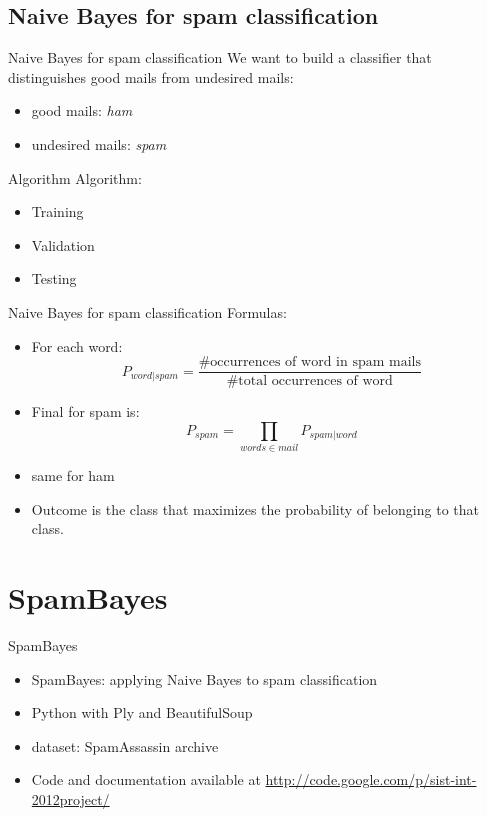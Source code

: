 \documentclass[xcolor=x11names,compress]{beamer}
\renewcommand{\(}{\begin{columns}}
\renewcommand{\)}{\end{columns}}
\newcommand{\<}[1]{\begin{column}{#1}}
\renewcommand{\>}{\end{column}}
\begin{document}
\subsection{Naive Bayes for spam classification}
\begin{frame}{Naive Bayes for spam classification}
We want to build a classifier that distinguishes good mails from undesired mails:
\begin{itemize}
    \item good mails: \textit{ham}
    \item undesired mails: \textit{spam}
\end{itemize}
\end{frame}

\begin{frame}{Algorithm}
Algorithm:
\begin{itemize}
    \item<1->Training
    \item<2->Validation
    \item<3->Testing
\end{itemize}
\end{frame}

\begin{frame}{Naive Bayes for spam classification}
Formulas:
\begin{itemize}
    \item<1->For each word: $$P_{word|spam} = \frac{\mbox{\# occurrences of word in spam mails}}{\mbox{\# total occurrences of word}}$$
    \item<2->Final for spam is: $$P_{spam} = \prod_{words \in mail} P_{spam|word}$$
    \item<3->same for ham
    \item<4->Outcome is the class that maximizes the probability of belonging to that class.
\end{itemize}
\end{frame}

\section{SpamBayes}
\begin{frame}{SpamBayes}
  \begin{itemize}
    \item SpamBayes: applying Naive Bayes to spam classification
    \item Python with Ply and BeautifulSoup
    \item dataset: SpamAssassin archive
    \item Code and documentation available at \url{http://code.google.com/p/sist-int-2012project/}\\
  \end{itemize}
\end{frame}
\end{document}
